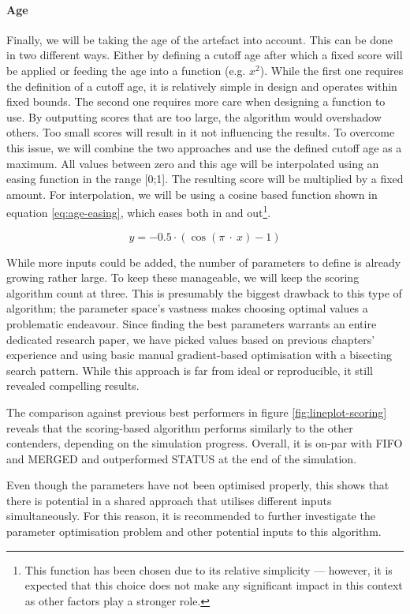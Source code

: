     \paragraph{Age} Finally, we will be taking the age of the artefact into account. This can be done in two different ways. Either by defining a cutoff age after which a fixed score will be applied or feeding the age into a function (e.g. $x^2$). While the first one requires the definition of a cutoff age, it is relatively simple in design and operates within fixed bounds. The second one requires more care when designing a function to use. By outputting scores that are too large, the algorithm would overshadow others. Too small scores will result in it not influencing the results. To overcome this issue, we will combine the two approaches and use the defined cutoff age as a maximum. All values between zero and this age will be interpolated using an easing function in the range [0;1]. The resulting score will be multiplied by a fixed amount. For interpolation, we will be using a cosine based function shown in equation \ref{eq:age-easing}, which eases both in and out\footnote{This function has been chosen due to its relative simplicity — however, it is expected that this choice does not make any significant impact in this context as other factors play a stronger role.}.
    
    \begin{equation}\label{eq:age-easing}
        y=-0.5\cdot\left(\cos\left(\pi\ \cdot\ x\right)-1\right)
    \end{equation}
    
    While more inputs could be added, the number of parameters to define is already growing rather large. To keep these manageable, we will keep the scoring algorithm count at three. This is presumably the biggest drawback to this type of algorithm; the parameter space's vastness makes choosing optimal values a problematic endeavour. Since finding the best parameters warrants an entire dedicated research paper, we have picked values based on previous chapters' experience and using basic manual gradient-based optimisation with a bisecting search pattern. While this approach is far from ideal or reproducible, it still revealed compelling results. 
    
    
    The comparison against previous best performers in figure \ref{fig:lineplot-scoring} reveals that the scoring-based algorithm performs similarly to the other contenders, depending on the simulation progress. Overall, it is on-par with FIFO and MERGED and outperformed STATUS at the end of the simulation.
    
    Even though the parameters have not been optimised properly, this shows that there is potential in a shared approach that utilises different inputs simultaneously. For this reason, it is recommended to further investigate the parameter optimisation problem and other potential inputs to this algorithm.
